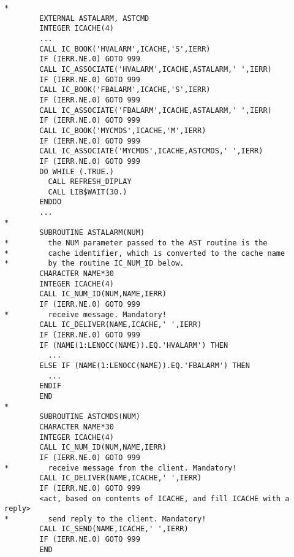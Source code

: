 \begin{routine}
\begin{describe}
\end{describe}
\begin{options}
\end{options}
\begin{returncodes}
\end{returncodes}
\begin{examplecode}\begin{verbatim}
*
        EXTERNAL ASTALARM, ASTCMD
        INTEGER ICACHE(4)
        ...
        CALL IC_BOOK('HVALARM',ICACHE,'S',IERR)
        IF (IERR.NE.0) GOTO 999
        CALL IC_ASSOCIATE('HVALARM',ICACHE,ASTALARM,' ',IERR)
        IF (IERR.NE.0) GOTO 999
        CALL IC_BOOK('FBALARM',ICACHE,'S',IERR)
        IF (IERR.NE.0) GOTO 999
        CALL IC_ASSOCIATE('FBALARM',ICACHE,ASTALARM,' ',IERR)
        IF (IERR.NE.0) GOTO 999
        CALL IC_BOOK('MYCMDS',ICACHE,'M',IERR)
        IF (IERR.NE.0) GOTO 999
        CALL IC_ASSOCIATE('MYCMDS',ICACHE,ASTCMDS,' ',IERR)
        IF (IERR.NE.0) GOTO 999
        DO WHILE (.TRUE.)
          CALL REFRESH_DIPLAY
          CALL LIB$WAIT(30.)
        ENDDO
        ...
*
        SUBROUTINE ASTALARM(NUM)
*         the NUM parameter passed to the AST routine is the
*         cache identifier, which is converted to the cache name
*         by the routine IC_NUM_ID below.
        CHARACTER NAME*30
        INTEGER ICACHE(4)
        CALL IC_NUM_ID(NUM,NAME,IERR)
        IF (IERR.NE.0) GOTO 999
*         receive message. Mandatory!
        CALL IC_DELIVER(NAME,ICACHE,' ',IERR)
        IF (IERR.NE.0) GOTO 999
        IF (NAME(1:LENOCC(NAME)).EQ.'HVALARM') THEN
          ...
        ELSE IF (NAME(1:LENOCC(NAME)).EQ.'FBALARM') THEN
          ...
        ENDIF
        END
*
        SUBROUTINE ASTCMDS(NUM)
        CHARACTER NAME*30
        INTEGER ICACHE(4)
        CALL IC_NUM_ID(NUM,NAME,IERR)
        IF (IERR.NE.0) GOTO 999
*         receive message from the client. Mandatory!
        CALL IC_DELIVER(NAME,ICACHE,' ',IERR)
        IF (IERR.NE.0) GOTO 999
        <act, based on contents of ICACHE, and fill ICACHE with a reply>
*         send reply to the client. Mandatory!
        CALL IC_SEND(NAME,ICACHE,' ',IERR)
        IF (IERR.NE.0) GOTO 999
        END
\end{verbatim}\end{examplecode}
\end{routine}

